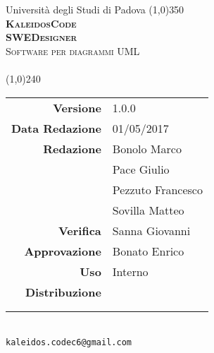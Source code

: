 \documentclass[a4paper,12pt]{article}
\author{KaleidosCode}
\date{09/03/2017}	%
\begin{document}
	\begin{titlepage}
		\centering Università degli Studi di Padova
		\line(1,0){350}\\
		\vspace{0.4cm}
		{\bfseries\scshape\LARGE KaleidosCode\\}
		\vspace{0.4cm}
		{\bfseries\scshape\LARGE SWEDesigner\\}
		{\scshape\Large Software per diagrammi UML\\}
		\vspace{1cm}
		{\scshape\Large \specificatecnicai\ \\}		%
		\vspace{1.4cm}
		\logo
		\vspace{1.2cm}
		\line(1,0){240}\\
		\begin{tabular}{r|l}
			{\hfill \textbf{Versione}} 			& 1.0.0\\
			{\hfill \textbf{Data Redazione}} 	& 01/05/2017\\	%
			{\hfill \textbf{Redazione}} 		& Bonolo Marco\\ & Pace Giulio\\ & Pezzuto Francesco\\ & Sovilla Matteo\\
			{\hfill \textbf{Verifica}} 			& Sanna Giovanni\\
			{\hfill \textbf{Approvazione}} 		& Bonato Enrico\\
			{\hfill \textbf{Uso}} 				& Interno\\
			{\hfill \textbf{Distribuzione}} 	& \vardanega \\ & \cardin \\ & \proponente\\
		\end{tabular}\\
		\vspace{2cm}
		\texttt{kaleidos.codec6@gmail.com}
	\end{titlepage}

	\pagestyle{myfront}
	\newpage
		
	\newpage
		\tableofcontents
	\newpage
		\listoftables
	\newpage
		\listoffigures
	\newpage
	\pagestyle{mymain}
		
	\newpage
		
	\newpage
		
	\newpage
		
	\newpage
		
	\appendix
	\newpage
		
	\label{LastPage}
\end{document}
